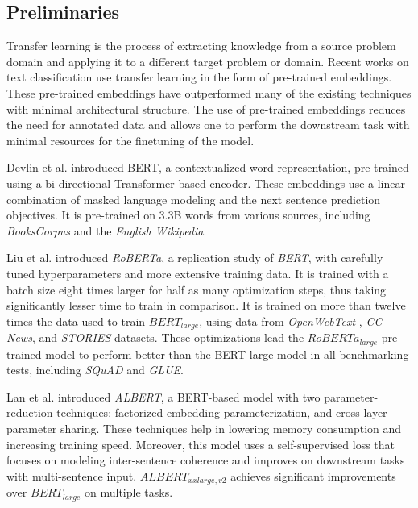 \documentclass[runningheads]{llncs}
\begin{document}
\subsection{Preliminaries}
Transfer learning is the process of extracting knowledge from a source problem domain and applying it to a different target problem or domain. Recent works on text classification use transfer learning in the form of pre-trained embeddings.\cite{yang2019xlnet,2020roberta,2020albert} These pre-trained embeddings have outperformed many of the existing techniques with minimal architectural structure. The use of pre-trained embeddings reduces the need for annotated data and allows one to perform the downstream task with minimal resources for the finetuning of the model.

Devlin et al.\cite{Devlin2019} introduced BERT, a contextualized word representation, pre-trained using a bi-directional Transformer-based encoder. These embeddings use a linear combination of masked language modeling and the next sentence prediction objectives. It is pre-trained on 3.3B words from various sources, including \textit{BooksCorpus}\cite{zhu2015aligning} and the \textit{English Wikipedia}. 

Liu et al. introduced \textit{RoBERTa}, a replication study of \textit{BERT}, with carefully tuned hyperparameters and more extensive training data\cite{2020roberta}. It is trained with a batch size eight times larger for half as many optimization steps, thus taking significantly lesser time to train in comparison. It is trained on more than twelve times the data used to train $BERT_{large}$, using data from \textit{OpenWebText} \cite{Gokaslan2019OpenWeb}, \textit{CC-News}\cite{CC-News}, and \textit{STORIES}\cite{journals/corr/abs-1806-02847} datasets. These optimizations lead the $RoBERTa_{large}$ pre-trained model to perform better than the BERT-large model in all benchmarking tests, including \textit{SQuAD}\cite{rajpurkar2016squad} and \textit{GLUE}\cite{wang-etal-2018-glue}. 

Lan et al. introduced \textit{ALBERT}, a BERT-based model with two parameter-reduction techniques: factorized embedding parameterization, and cross-layer parameter sharing.\cite{2020albert} These techniques help in lowering memory consumption and increasing training speed. Moreover, this model uses a self-supervised loss that focuses on modeling inter-sentence coherence and improves on downstream tasks with multi-sentence input. $ALBERT_{xxlarge,v2}$ achieves significant improvements over $BERT_{large}$ on multiple tasks.
\end{document}

